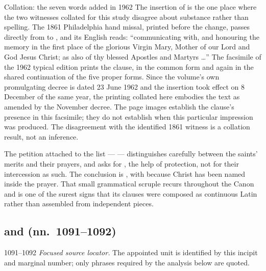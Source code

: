 \begin{proposal}{Collation: the seven words added in 1962}
The insertion of  is the
one place where the two witnesses collated for this study disagree about
substance rather than spelling. The 1861 Philadelphia hand missal, printed
before the change, passes directly from  to
, and its English
reads: ``communicating with, and honouring the memory in the first place of the
glorious Virgin Mary, Mother of our Lord and God Jesus Christ; as also of thy
blessed Apostles and Martyrs \dots'' The facsimile of the 1962 typical edition
prints the clause, in the common form and again in the shared continuation of
the five proper forms. Since the volume's own promulgating decree is dated 23
June 1962 and the insertion took effect on 8 December of the same year, the
printing collated here embodies the text as amended by the November decree.
The page images establish the clause's presence in this facsimile; they do not
establish when this particular impression was produced. The disagreement with
the identified 1861 witness is a collation result, not an inference.
\end{proposal}

The petition attached to the list ---  --- distinguishes
carefully between the saints' merits and their prayers, and asks for
, the help of protection, not for their
intercession as such. The conclusion is , with  because Christ has been named inside the
prayer. That small grammatical scruple recurs throughout the Canon and is one of
the surest signs that its clauses were composed as continuous Latin rather than
assembled from independent pieces.

\subsection*{ and  (nn.~1091--1092)}

\begin{appointed}{1091--1092}
\textit{Focused source locator.} The appointed unit is identified by this incipit and marginal number; only phrases required by the analysis below are quoted.
\end{appointed}

